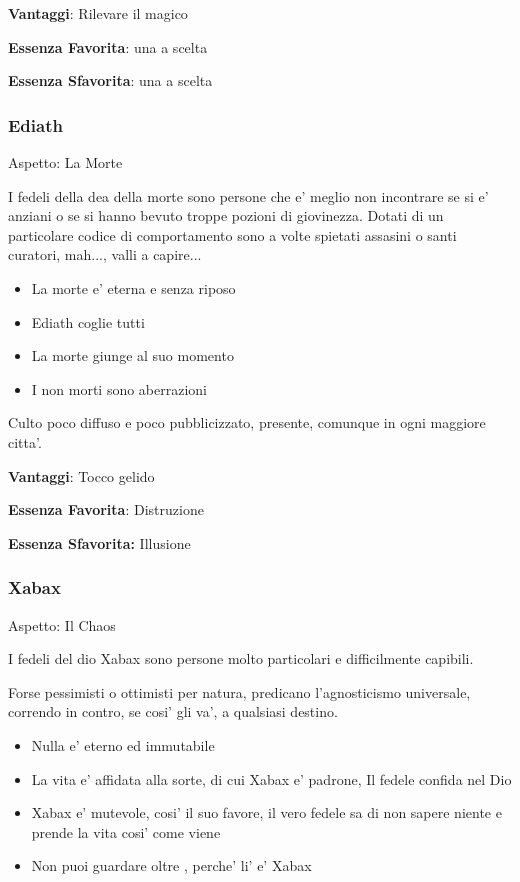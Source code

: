 \documentclass[a4paper,11pt,twoside,openany]{book}
\begin{document}
\textbf{Vantaggi}: Rilevare il magico

\textbf{Essenza Favorita}: una a scelta

\textbf{Essenza Sfavorita}: una a scelta
\bigskip

\subsubsection{Ediath}

Aspetto: La Morte
\bigskip


I fedeli della dea della morte sono persone che e' meglio non incontrare se si e' anziani o se si hanno bevuto troppe pozioni di giovinezza. Dotati di un particolare codice di comportamento sono a volte spietati assasini o santi curatori, mah..., valli a capire...

\begin{itemize}
	\item La morte e' eterna e senza riposo
	\item Ediath coglie tutti
	\item La morte giunge al suo momento
	\item I non morti sono aberrazioni
\end{itemize}


Culto poco diffuso e poco pubblicizzato, presente, comunque in ogni maggiore citta'.


\textbf{Vantaggi}: Tocco gelido

\textbf{Essenza Favorita}: Distruzione

\textbf{Essenza Sfavorita:} Illusione
\bigskip


\subsubsection{Xabax}

Aspetto: Il Chaos
\bigskip

I fedeli del dio Xabax sono persone molto particolari e difficilmente capibili.

Forse pessimisti o ottimisti per natura, predicano l'agnosticismo universale, correndo in contro, se cosi' gli va', a qualsiasi destino.


\begin{itemize}
	\item Nulla e' eterno ed immutabile
	\item La vita e' affidata alla sorte, di cui Xabax e' padrone, Il fedele confida nel Dio
	\item Xabax e' mutevole, cosi' il suo favore, il vero fedele sa di non sapere niente e prende la vita cosi' come viene
	\item Non puoi guardare oltre , perche' li' e' Xabax
\end{itemize}
\end{document}
